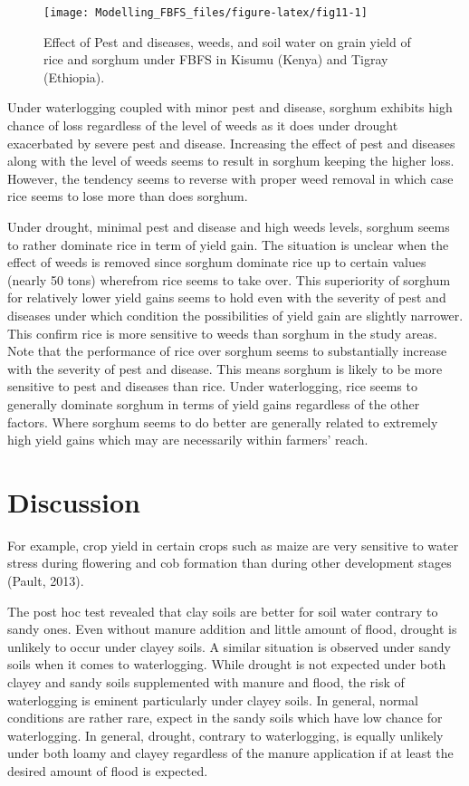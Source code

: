 \documentclass[12pt,oneside]{article}
\begin{document}
\begin{figure}[!htbp]

{\centering \texttt{[image: Modelling\_FBFS\_files/figure-latex/fig11-1]} 

}

\caption{Effect of Pest and diseases, weeds, and soil water on grain yield of rice and sorghum under FBFS in Kisumu (Kenya) and Tigray (Ethiopia).}\label{fig:fig11}
\end{figure}

Under waterlogging coupled with minor pest and disease, sorghum exhibits high chance of loss regardless of the level of weeds as it does under drought exacerbated by severe pest and disease. Increasing the effect of pest and diseases along with the level of weeds seems to result in sorghum keeping the higher loss. However, the tendency seems to reverse with proper weed removal in which case rice seems to lose more than does sorghum.

Under drought, minimal pest and disease and high weeds levels, sorghum seems to rather dominate rice in term of yield gain. The situation is unclear when the effect of weeds is removed since sorghum dominate rice up to certain values (nearly 50 tons) wherefrom rice seems to take over. This superiority of sorghum for relatively lower yield gains seems to hold even with the severity of pest and diseases under which condition the possibilities of yield gain are slightly narrower. This confirm rice is more sensitive to weeds than sorghum in the study areas. Note that the performance of rice over sorghum seems to substantially increase with the severity of pest and disease. This means sorghum is likely to be more sensitive to pest and diseases than rice.
Under waterlogging, rice seems to generally dominate sorghum in terms of yield gains regardless of the other factors. Where sorghum seems to do better are generally related to extremely high yield gains which may are necessarily within farmers' reach.

\hypertarget{V}{%
\section{Discussion}\label{V}}

For example, crop yield in certain crops such as maize are very sensitive to water stress during flowering and cob formation than during other development stages (Pault, 2013).

The post hoc test revealed that clay soils are better for soil water contrary to sandy ones. Even without manure addition and little amount of flood, drought is unlikely to occur under clayey soils. A similar situation is observed under sandy soils when it comes to waterlogging. While drought is not expected under both clayey and sandy soils supplemented with manure and flood, the risk of waterlogging is eminent particularly under clayey soils. In general, normal conditions are rather rare, expect in the sandy soils which have low chance for waterlogging. In general, drought, contrary to waterlogging, is equally unlikely under both loamy and clayey regardless of the manure application if at least the desired amount of flood is expected.
\end{document}

